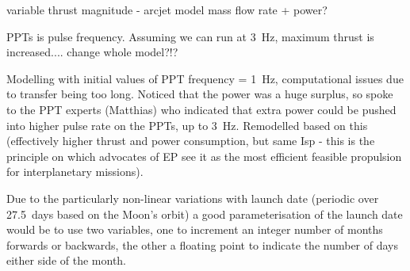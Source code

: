 variable thrust magnitude - arcjet model mass flow rate + power?

PPTs is pulse frequency. Assuming we can run at 3~Hz, maximum thrust is increased.... change whole model?!?

Modelling with initial values of PPT frequency = 1~Hz, computational issues due to transfer being too long. Noticed that the power was a huge surplus, so spoke to the PPT experts (Matthias) who indicated that extra power could be pushed into higher pulse rate on the PPTs, up to 3~Hz. Remodelled based on this (effectively higher thrust and power consumption, but same Isp - this is the principle on which advocates of EP see it as the most efficient feasible propulsion for interplanetary missions).

Due to the particularly non-linear variations with launch date (periodic over 27.5~days based on the Moon's orbit) a good parameterisation of the launch date would be to use two variables, one to increment an integer number of months forwards or backwards, the other a floating point to indicate the number of days either side of the month.

